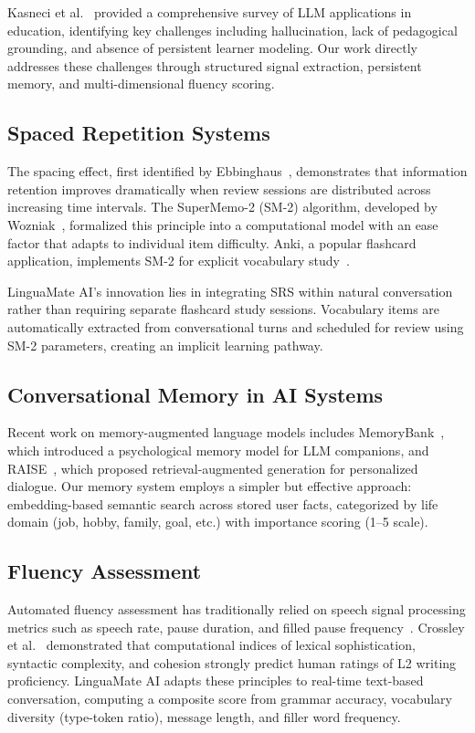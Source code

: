\documentclass[conference]{IEEEtran}
\begin{document}
Kasneci et al.~\cite{kasneci2023} provided a comprehensive survey of LLM applications in education, identifying key challenges including hallucination, lack of pedagogical grounding, and absence of persistent learner modeling. Our work directly addresses these challenges through structured signal extraction, persistent memory, and multi-dimensional fluency scoring.

\subsection{Spaced Repetition Systems}

The spacing effect, first identified by Ebbinghaus~\cite{ebbinghaus1885}, demonstrates that information retention improves dramatically when review sessions are distributed across increasing time intervals. The SuperMemo-2 (SM-2) algorithm, developed by Wozniak~\cite{wozniak1990}, formalized this principle into a computational model with an ease factor that adapts to individual item difficulty. Anki, a popular flashcard application, implements SM-2 for explicit vocabulary study~\cite{anki2006}.

LinguaMate AI's innovation lies in integrating SRS within natural conversation rather than requiring separate flashcard study sessions. Vocabulary items are automatically extracted from conversational turns and scheduled for review using SM-2 parameters, creating an implicit learning pathway.

\subsection{Conversational Memory in AI Systems}

Recent work on memory-augmented language models includes MemoryBank~\cite{zhong2024}, which introduced a psychological memory model for LLM companions, and RAISE~\cite{liu2023}, which proposed retrieval-augmented generation for personalized dialogue. Our memory system employs a simpler but effective approach: embedding-based semantic search across stored user facts, categorized by life domain (job, hobby, family, goal, etc.) with importance scoring (1--5 scale).

\subsection{Fluency Assessment}

Automated fluency assessment has traditionally relied on speech signal processing metrics such as speech rate, pause duration, and filled pause frequency~\cite{lennon1990}. Crossley et al.~\cite{crossley2016} demonstrated that computational indices of lexical sophistication, syntactic complexity, and cohesion strongly predict human ratings of L2 writing proficiency. LinguaMate AI adapts these principles to real-time text-based conversation, computing a composite score from grammar accuracy, vocabulary diversity (type-token ratio), message length, and filler word frequency.
\end{document}
